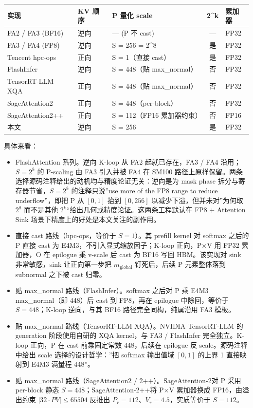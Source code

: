 \begin{table}[htbp]
\centering
\begin{tabular}{lllcl}
\toprule
实现 & KV 顺序 & P 量化 scale & 2\textasciicircum{}k & 累加器 \\
\midrule
FA2 / FA3 (BF16) & 逆向 & — (P 不 cast) & — & FP32 \\
FA3 / FA4 (FP8) & 逆向 & S = 256 = 2\textasciicircum{}8 & 是 & FP32 \\
Tencent hpc-ops & 正向 & S = 1（直接 cast） & 是 & FP32 \\
FlashInfer & 逆向 & S = 448（贴 max\_normal） & 否 & FP32 \\
TensorRT-LLM XQA & 正向 & S = 448（贴 max\_normal） & 否 & FP32 \\
SageAttention2 & 正向 & S = 448（per-block） & 否 & FP32 \\
SageAttention2++ & 正向 & S = 112（FP16 累加器约束） & 否 & FP16 \\
本文 & 逆向 & S = 256 & 是 & FP32 \\
\bottomrule
\end{tabular}
\end{table}

具体来看：

\begin{itemize}
  \item FlashAttention 系列。逆向 K-loop 从 FA2 起就已存在，FA3 / FA4 沿用；$S = 2^8$ 的 P-scaling 由 FA3 引入并被 FA4 在 SM100 路径上原样保留。两条选择源码注释给出的动机均与精度论证无关：逆向是为 mask phase 拆分与寄存器节省，$S = 2^8$ 的注释只说”use more of the FP8 range to reduce underflow”，即把 P 从 $[0, 1]$ 抬到 $[0, 256]$ 以减少下溢，但并未对”为何取 $2^8$ 而不是其他 $2^k$“给出几何或精度论证。这两条工程默认在 FP8 + Attention Sink 场景下精度上的好处是本文关注的副作用。
  \item 直接 cast 路线（hpc-ops，等价于 $S = 1$）。其 prefill kernel 对 softmax 之后的 P 直接 cast 为 E4M3，不引入显式缩放因子；K-loop 正向，P$\times$V 用 FP32 累加器，O 在 epilogue 乘 v-scale 后 cast 为 BF16 写回 HBM。该实现对 sink 非常敏感，sink 让正向第一步把 $m_{\text{global}}$ 钉死后，后续 P 元素整体落到 subnormal 之下被 cast 归零。
  \item 贴 max\_normal 路线（FlashInfer）。softmax 之后对 P 乘 E4M3 max\_normal（即 448）后 cast 到 FP8，再在 epilogue 中除回，等价于 $S = 448$；K-loop 逆向，与其 BF16 路径完全同构，纯属沿用 FA3 模板。
  \item 贴 max\_normal 路线（TensorRT-LLM XQA）。NVIDIA TensorRT-LLM 的 generation 阶段使用自研的 XQA kernel，与 FA3 / FlashInfer 完全独立。K-loop 正向，P 在 cast 前乘固定常数 448，后续在 epilogue 反 scale。源码注释中给出 scale 选择的设计哲学：”把 softmax 输出值域 $[0, 1]$ 的上界 1 直接映射到 E4M3 满量程 448”。
  \item 贴 max\_normal 路线（SageAttention2 / 2++）。SageAttention-2对 P 采用 per-block 静态 $S = 448$；SageAttention-2++将 P$\times$V 累加器换成 FP16，由溢出约束 $|32 \cdot P V| \le 65504$ 反推出 $P_r = 112$、$V_r = 4.5$，实质等价于 $S = 112$。
\end{itemize}

